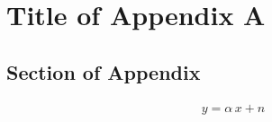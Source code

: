 \chapter{Title of Appendix A}
\label{appendix_0}
\graphicspath{{100_Appendices/}}

\section{Section of Appendix}
\lipsum[1-2]

\begin{align}
y=\alpha\,x+n
\end{align}
